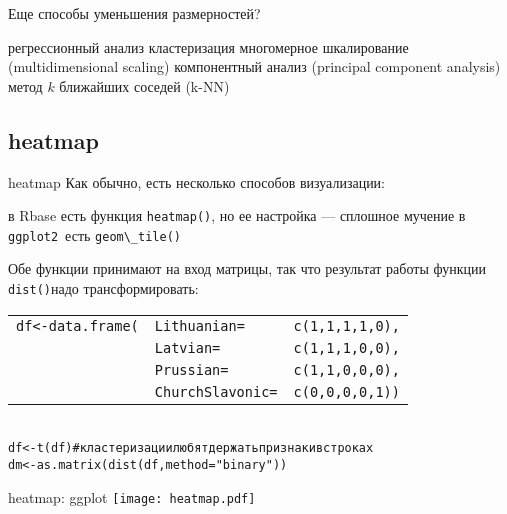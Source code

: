 \begin{frame}{Еще способы уменьшения размерностей?}
\begin{itemize}
\mytem регрессионный анализ
\mytem кластеризация
\mytem многомерное шкалирование (multidimensional scaling)
\mytem компонентный анализ (principal component analysis)
\mytem метод $k$ ближайших соседей (k-NN)
\end{itemize}
\end{frame}
\subsection{heatmap}
\begin{frame}{heatmap}
Как обычно, есть несколько способов визуализации:
\begin{itemize}
\mytem в Rbase есть функция \scriptsize\verb"heatmap()"\normalsize, но ее настройка — сплошное мучение
\mytem в \scriptsize\verb"ggplot2"\normalsize\ есть \scriptsize\verb"geom\_tile()"\normalsize
\end{itemize}
Обе функции принимают на вход матрицы, так что результат работы функции \scriptsize\verb"dist()"\normalsize надо трансформировать:
\scriptsize
\begin{alltt}
\begin{tabular}{lll}
df <- data.frame(& Lithuanian = & c(1, 1, 1, 1, 0), \\ 
 & Latvian = & c(1, 1, 1, 0, 0), \\ 
 & Prussian = & c(1, 1, 0, 0, 0), \\ 
 & ChurchSlavonic = & c(0, 0, 0, 0, 1)) \\ 
\end{tabular}
\\
df <- t(df) \hfill \# кластеризации любят держать признаки в строках\\
dm <- \alert{as.matrix(}dist(df, method = "binary")\alert{)}
\end{alltt}
\normalsize 
\end{frame}
\begin{frame}{heatmap: ggplot}
\texttt{[image: heatmap.pdf]}
\end{frame}
